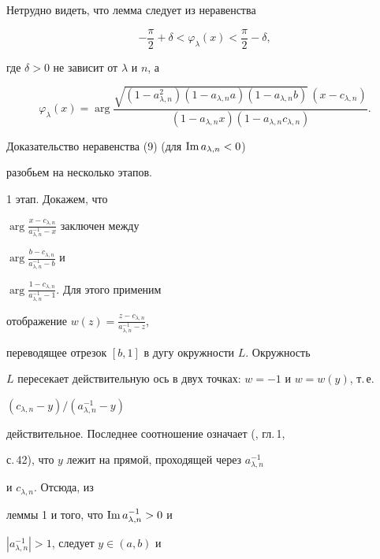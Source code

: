 \begin{pf}


Нетрудно видеть, что лемма следует из неравенства


\begin{equation}


-\frac{\pi}{2}+\delta<\varphi_\lambda(x)<\frac{\pi}{2}-\delta,


\end{equation}


где $\delta>0$ не зависит от $\lambda$ и $n$, а


$$


\varphi_\lambda(x)=\arg


\frac{\sqrt{(1-a^2_{\lambda,n})(1-a_{\lambda,n}a)


(1-a_{\lambda,n}b)}\,(x-c_{\lambda,n})}


{(1-a_{\lambda,n}x)(1-a_{\lambda,n}c_{\lambda,n})}.


$$





Доказательство неравенства (9) (для $\operatorname{Im} a_{\lambda,n}<0$)


разобьем на несколько этапов.





1 этап. Докажем, что


$\arg\frac{x-c_{\lambda,n}}{a^{-1}_{\lambda,n}-x}$ заключен между


$\arg\frac{b-c_{\lambda,n}}{a^{-1}_{\lambda,n}-b}$ и


$\arg\frac{1-c_{\lambda,n}}{a^{-1}_{\lambda,n}-1}$. Для этого применим


отображение $w(z)=\frac{z-c_{\lambda,n}}{a^{-1}_{\lambda,n}-z}$,


переводящее отрезок $[b,1]$ в дугу окружности $L$. Окружность


$L$ пересекает действительную ось в двух точках: $w=-1$ и $w=w(y)$, т.\,е.


$(c_{\lambda,n}-y)/(a^{-1}_{\lambda,n}-y)$


действительное. Последнее соотношение означает (\cite{16}, гл.\,1,


с.\,42), что $y$ лежит на прямой, проходящей через $a^{-1}_{\lambda,n}$


и $c_{\lambda,n}$. Отсюда, из


леммы 1 и того, что $\operatorname{Im} a^{-1}_{\lambda,n}>0$ и


$|a^{-1}_{\lambda,n}|>1$, следует $y\in(a,b)$ и



\end{pf}
